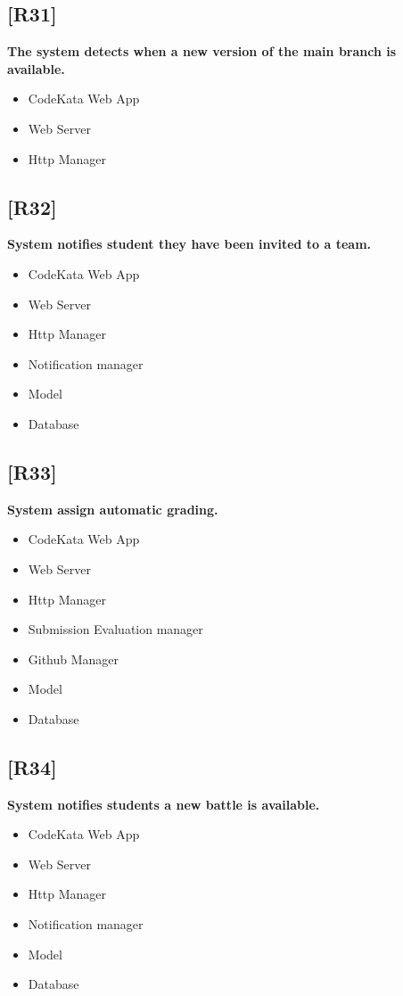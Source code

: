 \documentclass{article}
\begin{document}
\subsection{[R31]}
\textbf{ The system detects when a new version of the main branch is available.}
\begin{itemize}
\item CodeKata Web App
\item Web Server
\item Http Manager
\end{itemize}
\subsection{[R32]}
\textbf{ System notifies student they have been invited to a team.}
\begin{itemize}
\item CodeKata Web App
\item Web Server
\item Http Manager
\item Notification manager
\item Model
\item Database
\end{itemize}
\subsection{[R33]}
\textbf{ System assign automatic grading.}
\begin{itemize}
\item CodeKata Web App
\item Web Server
\item Http Manager
\item Submission Evaluation manager
\item Github Manager
\item Model
\item Database
\end{itemize}
\subsection{[R34]}
\textbf{ System notifies students a new battle is available.}
\begin{itemize}
\item CodeKata Web App
\item Web Server
\item Http Manager
\item Notification manager
\item Model
\item Database
\end{itemize}
\end{document}
